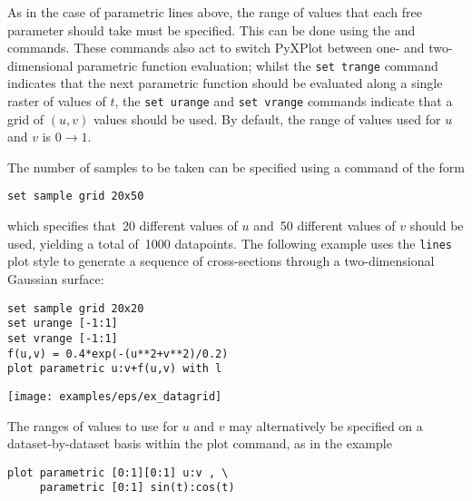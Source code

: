 As in the case of parametric lines above, the range of values that each free
parameter should take must be specified. This can be done using the  and  commands. These
commands also act to switch PyXPlot between one- and two-dimensional parametric
function evaluation; whilst the {\tt set trange} command indicates that the
next parametric function should be evaluated along a single raster of values of
$t$, the {\tt set urange} and {\tt set vrange} commands indicate that a grid of
$(u,v)$ values should be used. By default, the range of values used for $u$ and
$v$ is $0\to 1$.

The number of samples to be taken can be specified using a command of the
form
\begin{verbatim}
set sample grid 20x50
\end{verbatim}
which specifies that~20 different values of $u$ and~50 different values of $v$
should be used, yielding a total of~1000 datapoints. The following example uses
the {\tt lines} plot style to generate a sequence of cross-sections through a
two-dimensional Gaussian surface:
\begin{verbatim}
set sample grid 20x20
set urange [-1:1]
set vrange [-1:1]
f(u,v) = 0.4*exp(-(u**2+v**2)/0.2)
plot parametric u:v+f(u,v) with l
\end{verbatim}
\centerline{\texttt{[image: examples/eps/ex\_datagrid]}}

The ranges of values to use for $u$ and $v$ may alternatively be specified on a dataset-by-dataset
basis within the plot command, as in the example
\begin{verbatim}
plot parametric [0:1][0:1] u:v , \
     parametric [0:1] sin(t):cos(t)
\end{verbatim}


